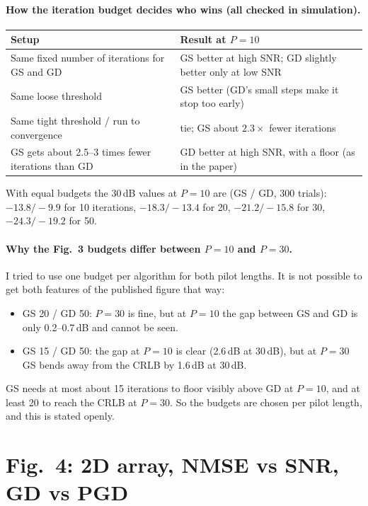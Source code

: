 \documentclass[11pt,a4paper]{article}
\begin{document}
\paragraph{How the iteration budget decides who wins (all checked in simulation).}
\begin{center}
\small
\begin{tabular}{ll}
\toprule
Setup & Result at $P=10$ \\
\midrule
Same fixed number of iterations for GS and GD & GS better at high SNR; GD slightly better only at low SNR \\
Same loose threshold & GS better (GD's small steps make it stop too early) \\
Same tight threshold / run to convergence & tie; GS about $2.3\times$ fewer iterations \\
GS gets about 2.5--3 times fewer iterations than GD & GD better at high SNR, with a floor (as in the paper) \\
\bottomrule
\end{tabular}
\end{center}
With equal budgets the 30\,dB values at $P=10$ are (GS / GD, 300 trials): $-13.8/-9.9$ for 10
iterations, $-18.3/-13.4$ for 20, $-21.2/-15.8$ for 30, $-24.3/-19.2$ for 50.

\paragraph{Why the Fig.~3 budgets differ between $P=10$ and $P=30$.}
I tried to use one budget per algorithm for both pilot lengths. It is not possible to get both
features of the published figure that way:
\begin{itemize}[leftmargin=*,itemsep=1pt]
  \item GS 20 / GD 50: $P=30$ is fine, but at $P=10$ the gap between GS and GD is only
        0.2--0.7\,dB and cannot be seen.
  \item GS 15 / GD 50: the gap at $P=10$ is clear (2.6\,dB at 30\,dB), but at $P=30$ GS bends away
        from the CRLB by 1.6\,dB at 30\,dB.
\end{itemize}
GS needs at most about 15 iterations to floor visibly above GD at $P=10$, and at least 20 to reach
the CRLB at $P=30$. So the budgets are chosen per pilot length, and this is stated openly.

\section{Fig.~4: 2D array, NMSE vs SNR, GD vs PGD}
\label{sec:fig4}
\end{document}
